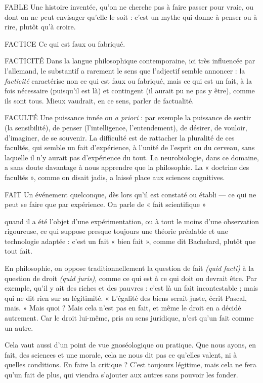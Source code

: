 
FABLE Une histoire inventée, qu’on ne cherche pas à faire passer pour vraie,
ou dont on ne peut envisager qu’elle le soit : c’est un mythe qui
donne à penser ou à rire, plutôt qu’à croire.

FACTICE Ce qui est faux ou fabriqué.

FACTICITÉ Dans la langue philosophique contemporaine, ici très influencée
par l’allemand, le substantif a rarement le sens que l’adjectif
semble annoncer : la {\it facticité} caractérise non ce qui est faux ou fabriqué, mais ce
qui est un fait, à la fois nécessaire (puisqu'il est là) et contingent (il aurait pu ne
pas y être), comme ils sont tous. Mieux vaudrait, en ce sens, parler de factualité.

FACULTÉ Une puissance innée ou {\it a priori} : par exemple la puissance de
sentir (la sensibilité), de penser (l'intelligence, l’entendement), de
désirer, de vouloir, d'imaginer, de se souvenir. La difficulté est de rattacher la pluralité
de ces facultés, qui semble un fait d'expérience, à l’unité de l'esprit ou du cerveau,
sans laquelle il n’y aurait pas d’expérience du tout. La neurobiologie, dans ce
domaine, a sans doute davantage à nous apprendre que la philosophie. La « doctrine
des facultés », comme on disait jadis, a laissé place aux sciences cognitives.

FAIT Un événement quelconque, dès lors qu’il est constaté ou établi — ce
qui ne peut se faire que par expérience. On parle de « fait scientifique »

quand il a été l’objet d’une expérimentation, ou à tout le moins d’une observation
rigoureuse, ce qui suppose presque toujours une théorie préalable et une
technologie adaptée : c’est un fait « bien fait », comme dit Bachelard, plutôt
que tout fait.

En philosophie, on oppose traditionnellement la question de fait {\it (quid
facti)} à la question de droit {\it (quid juris)}, comme ce qui est à ce qui doit ou
devrait être. Par exemple, qu’il y ait des riches et des pauvres : c’est là un fait
incontestable ; mais qui ne dit rien sur sa légitimité. « L'égalité des biens serait
juste, écrit Pascal, mais. » Mais quoi ? Mais cela n’est pas en fait, et même le
droit en a décidé autrement. Car le droit lui-même, pris au sens juridique, n’est
qu’un fait comme un autre.

Cela vaut aussi d’un point de vue gnoséologique ou pratique. Que nous
ayons, en fait, des sciences et une morale, cela ne nous dit pas ce qu’elles valent,
ni à quelles conditions. En faire la critique ? C’est toujours légitime, mais cela
ne fera qu’un fait de plus, qui viendra s'ajouter aux autres sans pouvoir les
fonder.

